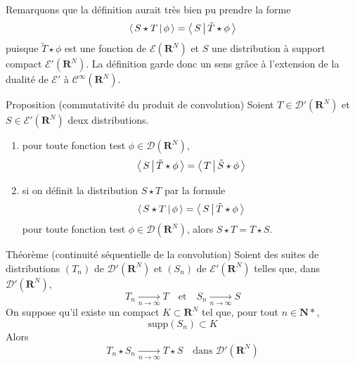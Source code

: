         Remarquons que la définition aurait très bien pu prendre la forme 
        \[ \left< \, S \star T \, \middle| \, \phi \, \right> = \left< \, S \, \middle| \, \tilde{T} \star \phi \, \right> \]   
        puisque $\tilde{T} \star \phi$ est une fonction de $\mathcal{E}(\mathbf{R}^N)$ et $S$ une distribution à support compact $\mathcal{E}'(\mathbf{R}^N)$. La définition garde donc un sens grâce à l’extension de la dualité de $\mathcal{E}'$ à $\mathcal{C}^{\infty}(\mathbf{R}^N)$.

        \begin{omed}{Proposition (commutativité du produit de convolution)}
            Soient $T \in \mathcal{D}'(\mathbf{R}^N)$ et $S \in \mathcal{E}'(\mathbf{R}^N)$ deux distributions. 
            \begin{enumerate}[label=($p_{\arabic*}$)]
                \item pour toute fonction test $\phi \in \mathcal{D}(\mathbf{R}^N)$, 
                \[ \left< \, S \, \middle| \, \tilde{T} \star \phi \, \right> = \left< \, T \, \middle| \, \tilde{S} \star \phi \, \right> \] 
                \item si on définit la distribution $S \star T$ par la formule 
                \[ \left< \, S \star T \, \middle| \, \phi \, \right> = \left< \, S \, \middle| \, \tilde{T} \star \phi \, \right> \]   
                pour toute fonction test $\phi \in \mathcal{D}(\mathbf{R}^N)$,  alors $S \star T = T \star S$.
            \end{enumerate}
        \end{omed}

        \begin{omed}{Théorème (continuité séquentielle de la convolution)}
            Soient des suites de distributions $(T_n)$ de $\mathcal{D}'(\mathbf{R}^N)$ et $(S_n)$ de $\mathcal{E}'(\mathbf{R}^N)$ telles que, dans $\mathcal{D}'(\mathbf{R}^N)$,
            \[ T_n \underset{n \to \infty}{\longrightarrow} T \quad \text{et} \quad S_n \underset{n \to \infty}{\longrightarrow} S\]   
            On suppose qu’il existe un compact $K \subset \mathbf{R}^N$ tel que, pour tout $n \in \mathbf{N}*$, 
            \[ \text{supp}(S_n ) \subset K \]   
            Alors 
            \[ T_n \star S_n \underset{n \to \infty}{\longrightarrow} T \star S \quad \text{dans } \mathcal{D}'(\mathbf{R}^N) \]   
        \end{omed}